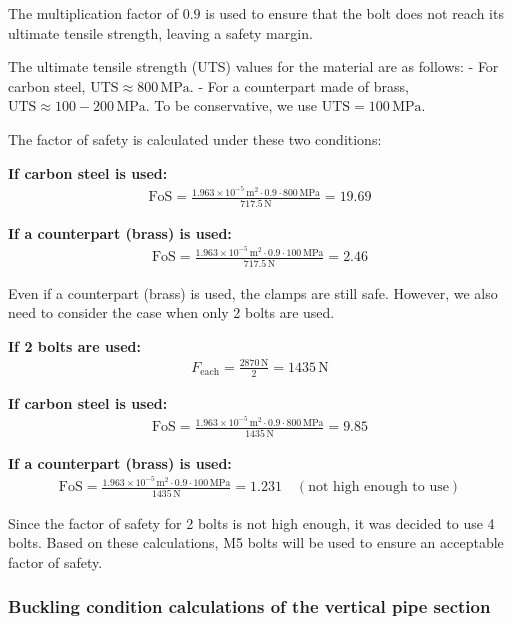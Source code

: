 \documentclass[12pt]{report}
\begin{document}
The multiplication factor of \( 0.9 \) is used to ensure that the bolt does not reach its ultimate tensile strength, leaving a safety margin.

The ultimate tensile strength (UTS) values for the material are as follows:
- For carbon steel, \( \text{UTS} \approx 800 \, \text{MPa} \).
- For a counterpart made of brass, \( \text{UTS} \approx 100 - 200 \, \text{MPa} \). To be conservative, we use \( \text{UTS} = 100 \, \text{MPa} \).

The factor of safety is calculated under these two conditions:

\textbf{If carbon steel is used:}
\begin{align}
\text{FoS} = \frac{1.963 \times 10^{-5} \, \text{m}^2 \cdot 0.9 \cdot 800 \, \text{MPa}}{717.5 \, \text{N}} = 19.69
\end{align}

\textbf{If a counterpart (brass) is used:}
\begin{align}
\text{FoS} = \frac{1.963 \times 10^{-5} \, \text{m}^2 \cdot 0.9 \cdot 100 \, \text{MPa}}{717.5 \, \text{N}} = 2.46
\end{align}

Even if a counterpart (brass) is used, the clamps are still safe. However, we also need to consider the case when only 2 bolts are used.

\textbf{If 2 bolts are used:}
\begin{align}
F_{\text{each}} = \frac{2870 \, \text{N}}{2} = 1435 \, \text{N}
\end{align}

\textbf{If carbon steel is used:}
\begin{align}
\text{FoS} = \frac{1.963 \times 10^{-5} \, \text{m}^2 \cdot 0.9 \cdot 800 \, \text{MPa}}{1435 \, \text{N}} = 9.85
\end{align}

\textbf{If a counterpart (brass) is used:}
\begin{align}
\text{FoS} = \frac{1.963 \times 10^{-5} \, \text{m}^2 \cdot 0.9 \cdot 100 \, \text{MPa}}{1435 \, \text{N}} = 1.231 \quad (\text{not high enough to use})
\end{align}

Since the factor of safety for 2 bolts is not high enough, it was decided to use 4 bolts. Based on these calculations, M5 bolts will be used to ensure an acceptable factor of safety.



\subsubsection{Buckling condition calculations of the vertical pipe section}
\end{document}
